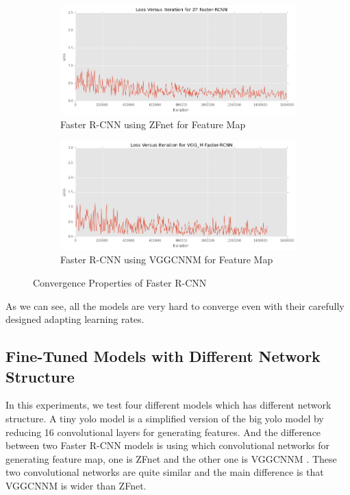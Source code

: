 \begin{figure}[H]
\centering
\begin{subfigure}[t]{.49\textwidth}
    \centering
    \includegraphics[width=1.0\linewidth]{img/FRCNN_zf_cov.png}
    \caption{Faster R-CNN using ZFnet for Feature Map}
\end{subfigure}
\begin{subfigure}[t]{.49\textwidth}
    \centering
    \includegraphics[width=1.0\linewidth]{img/FRCNN_vgg_m_cov.png}
    \caption{Faster R-CNN using VGG\textunderscore CNN\textunderscore M for Feature Map}
\end{subfigure}
\caption{Convergence Properties of Faster R-CNN}
\end{figure}

As we can see, all the models are very hard to converge even 
with their carefully designed adapting learning rates. 


\subsection{Fine-Tuned Models with Different Network Structure}
In this experiments, we test four different models which has 
different network structure.
A tiny yolo model is a simplified version of the big yolo model 
by reducing 16 convolutional layers for generating features. 
And the difference between two Faster R-CNN models
is using which convolutional networks for generating feature map,
one is ZFnet \cite{zeiler2014visualizing} and the other one is VGG\textunderscore CNN\textunderscore M \cite{chatfield2014return}. These two convolutional networks 
are quite similar and the main difference is that 
VGG\textunderscore CNN\textunderscore M 
is wider than ZFnet.

